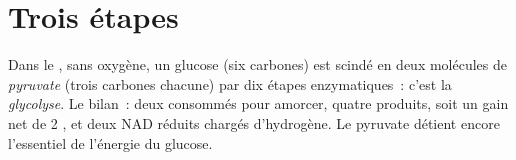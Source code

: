 \section{Trois étapes}

\begin{proposition}[La glycolyse]\label{prop:g12:respiration-fermentation:glycolysis}
Dans le , sans oxygène, un glucose (six carbones) est scindé
en deux molécules de \emph{pyruvate} (trois carbones chacune) par dix
étapes enzymatiques~: c'est la \emph{glycolyse}. Le
bilan~: deux  consommés pour amorcer, quatre produits, soit un gain
net de 2 , et deux NAD réduits chargés d'hydrogène. Le pyruvate
détient encore l'essentiel de l'énergie du glucose.
\end{proposition}
\admitted

